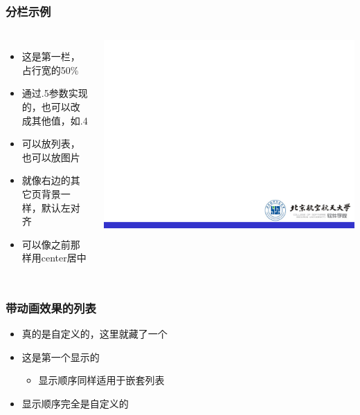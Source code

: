 \documentclass[17pt]{beamer}
\begin{document}
    \begin{frame}
        \frametitle{分栏示例}
        \begin{columns}

            \begin{itemize}
                \item 这是第一栏，占行宽的50\%
                \item 通过.5参数实现的，也可以改成其他值，如.4
                \item 可以放列表，也可以放图片
                \item 就像右边的其它页背景一样，默认左对齐
                \item 可以像之前那样用center居中
            \end{itemize}

                \includegraphics[height=0.4\textheight]{pic/bg2.png}

        \end{columns}
    \end{frame}

    \begin{frame}
        \frametitle{带动画效果的列表}
        \begin{itemize}
            \item<4-> 真的是自定义的，这里就藏了一个
            \item<1-> 这是第一个显示的
            \begin{itemize}
                \item<3-> 显示顺序同样适用于嵌套列表
            \end{itemize}
            \item<2-> 显示顺序完全是自定义的
        \end{itemize}
    \end{frame}
    
\end{document}
